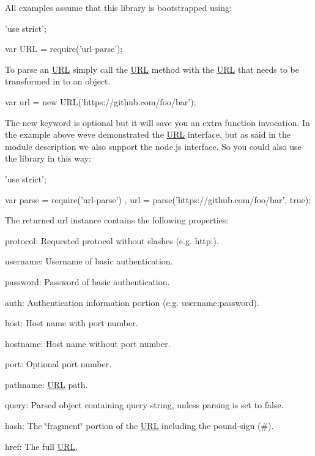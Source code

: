 All examples assume that this library is bootstrapped using\+:


\begin{DoxyCode}
'use strict';

var URL = require('url-parse');
\end{DoxyCode}


To parse an \mbox{\hyperlink{namespace_u_r_l}{U\+RL}} simply call the {\ttfamily \mbox{\hyperlink{namespace_u_r_l}{U\+RL}}} method with the \mbox{\hyperlink{namespace_u_r_l}{U\+RL}} that needs to be transformed in to an object.


\begin{DoxyCode}
var url = new URL('https://github.com/foo/bar');
\end{DoxyCode}


The {\ttfamily new} keyword is optional but it will save you an extra function invocation. In the example above we\textquotesingle{}ve demonstrated the \mbox{\hyperlink{namespace_u_r_l}{U\+RL}} interface, but as said in the module description we also support the node.\+js interface. So you could also use the library in this way\+:


\begin{DoxyCode}
'use strict';

var parse = require('url-parse')
  , url = parse('https://github.com/foo/bar', true);
\end{DoxyCode}


The returned {\ttfamily url} instance contains the following properties\+:


\begin{DoxyItemize}
\item {\ttfamily protocol}\+: Requested protocol without slashes (e.\+g. {\ttfamily http\+:}).
\item {\ttfamily username}\+: Username of basic authentication.
\item {\ttfamily password}\+: Password of basic authentication.
\item {\ttfamily auth}\+: Authentication information portion (e.\+g. {\ttfamily username\+:password}).
\item {\ttfamily host}\+: Host name with port number.
\item {\ttfamily hostname}\+: Host name without port number.
\item {\ttfamily port}\+: Optional port number.
\item {\ttfamily pathname}\+: \mbox{\hyperlink{namespace_u_r_l}{U\+RL}} path.
\item {\ttfamily query}\+: Parsed object containing query string, unless parsing is set to false.
\item {\ttfamily hash}\+: The \char`\"{}fragment\char`\"{} portion of the \mbox{\hyperlink{namespace_u_r_l}{U\+RL}} including the pound-\/sign ({\ttfamily \#}).
\item {\ttfamily href}\+: The full \mbox{\hyperlink{namespace_u_r_l}{U\+RL}}.
\end{DoxyItemize}

